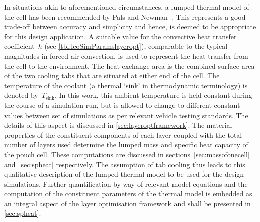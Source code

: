 In  situations akin  to  aforementioned circumstances,  a  lumped thermal  model
of  the cell  has  been  recommended by  Pals  and Newman~\cite{Pals1995}.  This
represents a good trade-off between accuracy and simplicity and hence, is deemed
to  be  appropriate for  this  design  application.  A  suitable value  for  the
convective heat transfer  coefficient~$h$ (see \cref{tbl:lcoSimParamslayeropt}),
comparable  to the  typical  magnitudes in  forced air  convection,  is used  to
represent the heat transfer from the  cell to the environment. The heat exchange
area is the combined  surface area of the two cooling tabs  that are situated at
either end  of the  cell. The temperature  of the coolant  (a thermal  `sink' in
thermodynamic  terminology) is  denoted by~$T_\text{sink}$.  In this  work, this
ambient temperature is held constant during  the course of a simulation run, but
is allowed  to change to  different constant  values between set  of simulations
as  per relevant  vehicle  testing  standards. The  details  of  this aspect  is
discussed  in  \cref{sec:layeroptframework}.  The  material  properties  of  the
constituent components  of each layer  coupled with  the total number  of layers
used  determine  the  lumped  mass  and specific  heat  capacity  of  the  pouch
cell.  These  computations  are  discussed  in  sections~\ref{sec:massofonecell}
and~\ref{sec:spheat} respectively. The  assumption of tab cooling  thus leads to
this qualitative  description of  the lumped  thermal model to  be used  for the
design simulations.  Further quantification by  way of relevant  model equations
and  the computation  of  the constituent  parameters of  the  thermal model  is
embedded as an integral aspect of  the layer optimisation framework and shall be
presented in \cref{sec:spheat}.

